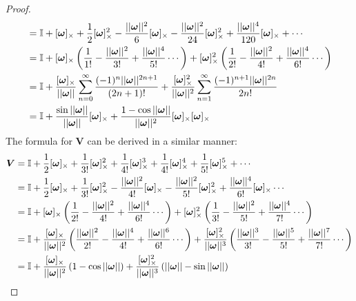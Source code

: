 \begin{proof}
\begin{subequations}
\begin{align*}
       &= \mathbb{I} + [\bm{\omega}]_{\times} + \frac{1}{2}[\bm{\omega}]_{\times}^2 -\frac{||\bm{\omega}||^2}{6}[\bm{\omega}]_{\times} - \frac{||\bm{\omega}||^2}{24}[\bm{\omega}]_{\times}^2 + \frac{||\bm{\omega}||^4}{120}[\bm{\omega}]_{\times} + \cdots \\
       &= \mathbb{I} + [\bm{\omega}]_{\times}\left(\frac{1}{1!} - \frac{||\bm{\omega}||^2}{3!} + \frac{||\bm{\omega}||^4}{5!} \cdots\right)
       + [\bm{\omega}]_{\times}^2\left(\frac{1}{2!} - \frac{||\bm{\omega}||^2}{4!} + \frac{||\bm{\omega}||^4}{6!} \cdots\right)\\
       &= \mathbb{I} + \frac{[\bm{\omega}]_{\times}}{||\bm{\omega}||}\sum_{n=0}^{\infty}\frac{(-1)^{n}||\bm{\omega}||^{2n+1}}{(2n+1)!}
       + \frac{[\bm{\omega}]_{\times}^2}{||\bm{\omega}||^2}\sum_{n=1}^{\infty}\frac{(-1)^{n+1}||\bm{\omega}||^{2n}}{2n!} \\
    &= \mathbb{I}
    + \frac{\sin{||\bm{\omega}||}}{||\bm{\omega}||}[\bm{\omega}]_{\times}
    + \frac{1-\cos{||\bm{\omega}||}}{||\bm{\omega}||^2}
       [\bm{\omega}]_{\times}[\bm{\omega}]_{\times}
\end{align*}
\end{subequations} 
The formula for \(\bm{V}\) can be derived in a similar manner:
\begin{subequations}
\begin{align*}
\bm{V} &= \mathbb{I} + \frac{1}{2}[ \bm{\omega} ]_{\times}+ \frac{1}{3!}[ \bm{\omega} ]_{\times}^2 + \frac{1}{4!}[ \bm{\omega} ]_{\times}^3 + \frac{1}{4!}[ \bm{\omega} ]_{\times}^4 + \frac{1}{5!}[ \bm{\omega} ]_{\times}^5 + \cdots \\
    &= \mathbb{I} + \frac{1}{2}[ \bm{\omega} ]_{\times}+ \frac{1}{3!}[ \bm{\omega} ]_{\times}^2 - \frac{||\bm{\omega}||^2}{4!}[ \bm{\omega} ]_{\times} - \frac{||\bm{\omega}||^2}{5!}[ \bm{\omega} ]_{\times}^2 + \frac{||\bm{\omega}||^4}{6!}[ \bm{\omega} ]_{\times} \cdots \\
    &= \mathbb{I} + [ \bm{\omega} ]_{\times}\left(\frac{1}{2!} - \frac{||\bm{\omega}||^2}{4!} + \frac{||\bm{\omega}||^4}{6!} \cdots\right)
+ [ \bm{\omega} ]_{\times}^2\left(\frac{1}{3!} - \frac{||\bm{\omega}||^2}{5!} + \frac{||\bm{\omega}||^4}{7!}\cdots\right)\\
    &= \mathbb{I} + \frac{[ \bm{\omega} ]_{\times}}{||\bm{\omega}||^2}\left(\frac{||\bm{\omega}||^2}{2!} - \frac{||\bm{\omega}||^4}{4!} + \frac{||\bm{\omega}||^6}{6!} \cdots\right)
+ \frac{[ \bm{\omega} ]_{\times}^2}{||\bm{\omega}||^3}\left(\frac{||\bm{\omega}||^3}{3!} - \frac{||\bm{\omega}||^5}{5!} + \frac{||\bm{\omega}||^7}{7!}\cdots\right) \\
    &= \mathbb{I} + \frac{[ \bm{\omega} ]_{\times}}{||\bm{\omega}||^2}\left(1 - \cos{||\bm{\omega}||}\right)
    + \frac{[ \bm{\omega} ]_{\times}^2}{||\bm{\omega}||^3}\left(||\bm{\omega}||-\sin{||\bm{\omega}||}\right)
\end{align*}
\end{subequations}
\end{proof}

